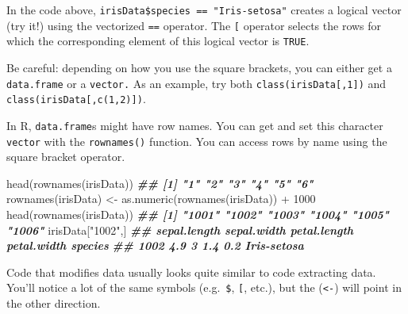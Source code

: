 \documentclass[
  12pt,
  krantz2]{krantz}
\makeatletter
\newenvironment{Shaded}{\begin{snugshade}}{\end{snugshade}}
\newcommand{\DecValTok}[1]{\textcolor[rgb]{0.06,0.06,0.06}{#1}}
\newcommand{\DocumentationTok}[1]{\textcolor[rgb]{0.37,0.37,0.37}{\textbf{\textit{#1}}}}
\newcommand{\FunctionTok}[1]{\textcolor[rgb]{0,0,0}{#1}}
\newcommand{\NormalTok}[1]{#1}
\newcommand{\OtherTok}[1]{\textcolor[rgb]{0.37,0.37,0.37}{#1}}
\newcommand{\SpecialCharTok}[1]{\textcolor[rgb]{0,0,0}{#1}}
\newcommand{\StringTok}[1]{\textcolor[rgb]{0.5,0.5,0.5}{#1}}
\newenvironment{kframe}{%
\medskip{}
\setlength{\fboxsep}{.8em}
 \def\at@end@of@kframe{}%
 \ifinner\ifhmode%
  \def\at@end@of@kframe{\end{minipage}}%
  \begin{minipage}{\columnwidth}%
 \fi\fi%
 \def\FrameCommand##1{\hskip\@totalleftmargin \hskip-\fboxsep
 \colorbox{shadecolor}{##1}\hskip-\fboxsep
     \hskip-\linewidth \hskip-\@totalleftmargin \hskip\columnwidth}%
 \MakeFramed {\advance\hsize-\width
   \@totalleftmargin\z@ \linewidth\hsize
   \@setminipage}}%
 {\par\unskip\endMakeFramed%
 \at@end@of@kframe}
\renewenvironment{Shaded}{\begin{kframe}}{\end{kframe}}
\makeatother
\begin{document}
In the code above, \texttt{irisData\$species\ ==\ "Iris-setosa"} creates a logical vector (try it!) using the vectorized \texttt{==} operator. The \texttt{{[}} operator selects the rows for which the corresponding element of this logical vector is \texttt{TRUE}.

Be careful: depending on how you use the square brackets, you can either get a \texttt{data.frame} or a \texttt{vector.} As an example, try both \texttt{class(irisData{[},1{]})} and \texttt{class(irisData{[},c(1,2){]})}.

In R, \texttt{data.frame}s might have row names. You can get and set this character \texttt{vector} with the \texttt{rownames()} function. You can access rows by name using the square bracket operator.

\begin{Shaded}
\begin{Highlighting}[]
\FunctionTok{head}\NormalTok{(}\FunctionTok{rownames}\NormalTok{(irisData))}
\DocumentationTok{\#\# [1] "1" "2" "3" "4" "5" "6"}
\FunctionTok{rownames}\NormalTok{(irisData) }\OtherTok{\textless{}{-}} \FunctionTok{as.numeric}\NormalTok{(}\FunctionTok{rownames}\NormalTok{(irisData)) }\SpecialCharTok{+} \DecValTok{1000}
\FunctionTok{head}\NormalTok{(}\FunctionTok{rownames}\NormalTok{(irisData))}
\DocumentationTok{\#\# [1] "1001" "1002" "1003" "1004" "1005" "1006"}
\NormalTok{irisData[}\StringTok{"1002"}\NormalTok{,]}
\DocumentationTok{\#\#      sepal.length sepal.width petal.length petal.width     species}
\DocumentationTok{\#\# 1002          4.9           3          1.4         0.2 Iris{-}setosa}
\end{Highlighting}
\end{Shaded}

Code that modifies data usually looks quite similar to code extracting data. You'll notice a lot of the same symbols (e.g.~\texttt{\$}, \texttt{{[}}, etc.), but the (\texttt{\textless{}-}) will point in the other direction.
\end{document}
